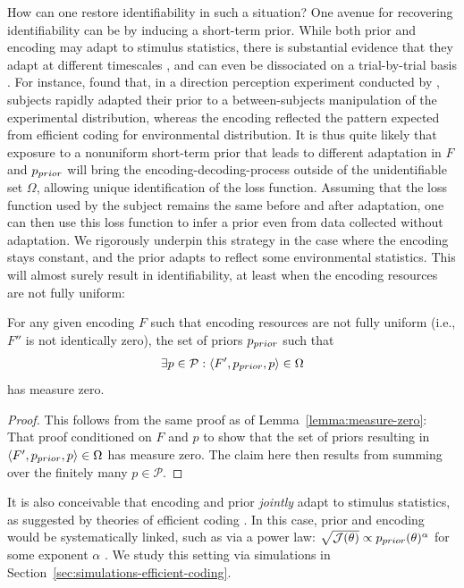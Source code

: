 How can one restore identifiability  in such a situation?
One avenue for recovering identifiability can be by inducing a short-term prior.
While both prior and encoding may adapt to stimulus statistics, there is substantial evidence that they adapt at different timescales \citep{Fritsche2020ABA, hahn2024unifying}, and can even be dissociated on a trial-by-trial basis \citep{Fritsche2020ABA}.
For instance, \cite{hahn2024unifying} found that, in a direction perception experiment conducted by \citet{gekas2013complexityas}, subjects rapidly adapted their prior to a between-subjects manipulation of the experimental distribution, whereas the encoding reflected the pattern expected from efficient coding for environmental distribution.
It is thus quite likely that exposure to a nonuniform short-term prior that leads to different adaptation in $F$ and $p_{prior}$ will bring the encoding-decoding-process outside of the unidentifiable set $\Omega$, allowing unique identification of the loss function.
Assuming that the loss function used by the subject remains the same before and after adaptation, one can then use this loss function to infer a prior even from data collected without adaptation.
We rigorously underpin this strategy in the case where the encoding stays constant, and the prior adapts to reflect some environmental statistics. This will almost surely result in identifiability, at least when the encoding resources are not fully uniform:
\begin{thm}\label{theorem:only-prior-adapts}
    For any given encoding $F$ such that encoding resources are not fully uniform (i.e., $F''$ is not identically zero), the set of priors $p_{prior}$ such that
        \begin{equation}
        \exists p \in \mathcal{P}: \langle F', p_{prior}, p\rangle \in \Omega
    \end{equation}
    has measure zero.
\end{thm}
\begin{proof}
This follows from the same proof as of Lemma~\ref{lemma:measure-zero}: 
That proof conditioned on $F$ and $p$ to show that the set of priors resulting in $\langle F', p_{prior}, p\rangle \in \Omega$ has measure zero.
The claim here then results from summing over the finitely many $p \in \mathcal{P}$.
\end{proof}

It is also conceivable that  encoding and prior \emph{jointly} adapt to stimulus statistics, as suggested by theories of efficient coding \citep[e.g.][]{Wei2015ABO, Morais2018PowerlawEN}.
In this case, prior and encoding would be systematically linked, such as via a power law: $\sqrt{\mathcal{J}(\theta)} \propto p_{prior}(\theta)^\alpha$ for some exponent $\alpha$ \citep[e.g.][]{Wei2015ABO, Morais2018PowerlawEN}.
We study this setting via simulations in Section~\ref{sec:simulations-efficient-coding}.

